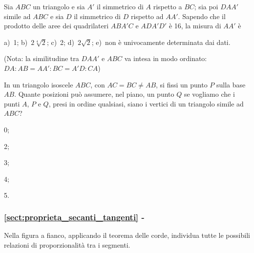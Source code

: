 \begin{esercizio}
\label{ese:6.97}
Sia $ABC$ un triangolo e sia $A'$ il simmetrico di $A$ rispetto a 
$BC$; sia poi $DAA'$ simile ad $ABC$ e sia $D$ il simmetrico di $D$ 
rispetto ad $AA'$. Sapendo che il prodotto delle aree dei 
quadrilateri $ABA'C$ e $ADA'D'$ è 16, la misura di $AA'$ è

\vspace{6pt}
a)~1; \quad b)~$2\sqrt[4]{2}$; \quad c)~2; \quad d)~$2\sqrt{2}$; \quad
e)~non è univocamente determinata dai dati.

\vspace{6pt}
\noindent (Nota: la similitudine tra $DAA'$ e $ABC$ va intesa in modo ordinato: 
$DA : AB = AA':BC=A'D:CA$)
\end{esercizio}

\begin{esercizio}
\label{ese:6.98}
In un triangolo isoscele $ABC$, con $AC = BC \neq AB$, si fissi un 
punto $P$ sulla base $AB$. Quante posizioni può assumere, nel piano, 
un punto $Q$ se vogliamo che i punti $A$, $P$ e $Q$, presi in ordine 
qualsiasi, siano i vertici di un triangolo simile ad $ABC$?
\begin{multicols}{5}
\begin{enumeratea}
\item 0;
\item 2;
\item 3;
\item 4;
\item 5.
\end{enumeratea}
\end{multicols}
\end{esercizio}

\begingroup
\hypersetup{linkcolor=black}
\subsubsection*{\ref{sect:proprieta_secanti_tangenti} - 
}
\endgroup

\noindent\begin{minipage}{.5\textwidth}
\begin{esercizio}
\label{ese:6.99}
Nella figura a fianco, applicando il teorema delle corde, 
individua tutte le possibili relazioni di proporzionalità tra i 
segmenti.
\end{esercizio}
\end{minipage}
\begin{minipage}{.5\textwidth}
\begin{inaccessibleblock}
 \begin{center}  \end{center}
\end{inaccessibleblock}
\end{minipage}

